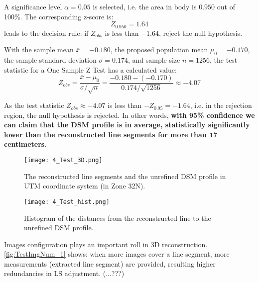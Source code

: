 A significance level $\alpha=0.05$ is selected, i.e. the area in body is $0.950$ out of 100\%. The corresponding z-score is:
\begin{equation*}
Z_{0.950}=1.64
\end{equation*}
leads to the decision rule: if $Z_{obs}$ is less than $-1.64$, reject the null hypothesis.

With the sample mean $\overline{x}=-0.180$,
the proposed population mean $\mu_0=-0.170$,
the sample standard deviation $\sigma=0.174$,
and sample size $n=1256$, the test statistic for a One Sample Z Test has a calculated value:
\begin{equation*}
Z_{obs} = \frac{\overline{x}-\mu_0}{\sigma/\sqrt{n}}=\frac{-0.180-(-0.170)}{0.174/\sqrt{1256}}\approx-4.07
\end{equation*}

As the test statistic $Z_{obs}\approx-4.07$ is less than $-Z_{0.95}=-1.64$, i.e. in the rejection region, the null hypothesis is rejected. In other words, \textbf{with 95\% confidence we can claim that the DSM profile is in average, statistically significantly lower than the reconstructed line segments for more than $\mathbf{17}$ centimeters}. %

\begin{figure}
  \centering
  \texttt{[image: 4\_Test\_3D.png]} %
  \caption{\small The reconstructed line segments and the unrefined DSM profile in UTM coordinate system (in Zone 32N).}
  \label{fig:Test3D_1}
  \vspace{1cm}
  \texttt{[image: 4\_Test\_hist.png]} %
  \caption{\small Histogram of the distances from the reconstructed line to the unrefined DSM profile.}
  \label{fig:TestHist_1}
\end{figure}

\clearpage

Images configuration plays an important roll in 3D reconstruction. %
\cref{fig:TestImgNum_1} shows: when more images cover a line segment, more measurements (extracted line segment) are provided, resulting higher redundancies in LS adjustment. (...???)


